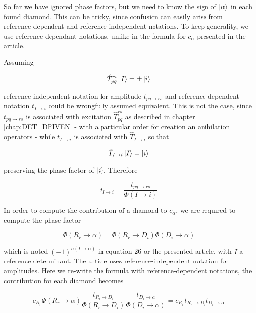 \documentclass[./thesis.tex]{subfiles}
\begin{document}
So far we have ignored phase factors, but we need to know the sign of ${\ket{\alpha}}$ in each found diamond. This can be tricky, since confusion can easily arise from reference-dependent and reference-independent notations. To keep generality, we use reference-dependant notations, unlike in the formula for $c_\alpha$ presented in the article.

Assuming

\begin{equation}
\hat T_{pq}^{rs} \ket I = \pm \ket i
\end{equation}

reference-independent notation for amplitude $t_{pq \rightarrow rs}$ and reference-dependent notation $t_{I \rightarrow i}$ could be wrongfully assumed equivalent. This is not the case, since $t_{pq \rightarrow rs}$ is associated with excitation $\hat T_{pq}^{rs}$ as described in chapter \ref{chap:DET_DRIVEN} - with a particular order for creation an anihilation operators - while $t_{I \rightarrow i}$ is associated with $\hat T_{I \rightarrow i}$ so that

\begin{equation}
\hat T_{I \rightarrow i}  \ket I = \ket i
\end{equation}

preserving the phase factor of $\ket i$. Therefore


\begin{equation}
t_{I \rightarrow i} = \frac{t_{pq \rightarrow rs}}{\Phi(I \rightarrow i)}
\end{equation}

In order to compute the contribution of a diamond to $c_\alpha$, we are required to compute the phase factor

\begin{equation}
\Phi(R _r \rightarrow \alpha) = \Phi(R _r \rightarrow D_i) \Phi(D_i \rightarrow \alpha)
\end{equation}



which is noted $(-1)^{n(I \rightarrow \alpha)}$ in equation 26 or the presented article, with $I$ a reference determinant. The article uses reference-independent notation for amplitudes. Here we re-write the formula with reference-dependent notations, the contribution for each diamond becomes

\begin{equation}
c_{R _r} \Phi(R _r \rightarrow \alpha) \frac{t_{R _r \rightarrow D_i}}{\Phi(R _r \rightarrow D_i)} \frac{t_{D_i \rightarrow \alpha}}{\Phi(D_i \rightarrow \alpha)} =c_{R _r} t_{R_r \rightarrow D_i} t_{D_i \rightarrow \alpha}
\end{equation}
\end{document}
